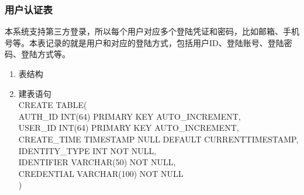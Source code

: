 \subsubsection{用户认证表}
本系统支持第三方登录，所以每个用户对应多个登陆凭证和密码，比如邮箱、手机号等。本表记录的就是用户和对应的登陆方式，包括用户ID、登陆账号、登陆密码、登陆方式等。
\begin{enumerate}
    \item 表结构
    \begin{table}[htbp]
        \centering
        \end{table}
    \item 建表语句\\
        CREATE TABLE(\\
            AUTH\_ID INT(64) PRIMARY KEY AUTO\_INCREMENT,\\
            USER\_ID INT(64) PRIMARY KEY AUTO\_INCREMENT,\\
            CREATE\_TIME TIMESTAMP NULL DEFAULT CURRENTTIMESTAMP,\\
            IDENTITY\_TYPE INT NOT NULL,\\
            IDENTIFIER VARCHAR(50) NOT NULL,\\
            CREDENTIAL VARCHAR(100) NOT NULL\\
        )
    \end{enumerate}